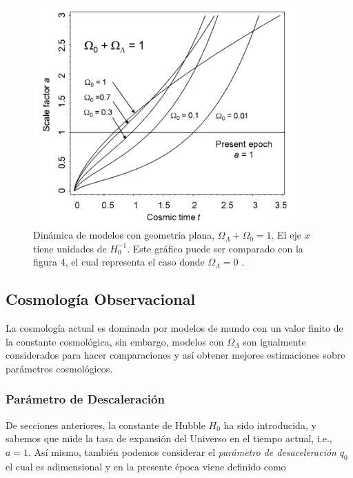 \documentclass[11pt]{article}
\begin{document}
    
    \begin{figure}[H]         
     \centering
     \includegraphics[width=0.9\textwidth]{flat_models_pp229_Malcolm.png}
        \caption{\footnotesize{Dinámica de modelos con geometría plana, $\Omega_{\Lambda} + \Omega_0 = 1$. El eje $x$ tiene unidades de  $H_0^{-1}$. Este gráfico puede ser comparado con la figura 4, el cual representa el caso donde $\Omega_{\Lambda}=0$ .}}
     \end{figure}
    
    \subsection{Cosmología Observacional}
    
    La cosmología actual es dominada por modelos de mundo con un valor finito de la constante cosmológica, sin embargo, modelos con $\Omega_{\Lambda}$ son igualmente considerados para hacer comparaciones y así obtener mejores estimaciones sobre parámetros cosmológicos.
    
    \subsubsection{Parámetro de Descaleración}
    
    De secciones anteriores, la constante de Hubble $H_0$ ha sido introducida, y sabemos que mide la tasa de expansión del Universo en el tiempo actual, i.e., $a=1$. Así mismo, también podemos considerar el {\textit{parámetro de desaceleración}} $q_0$ el cual es adimensional y en la presente época viene definido como
    
\end{document}
